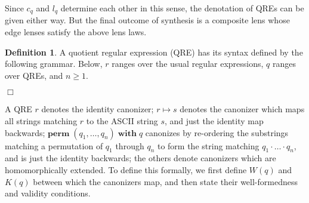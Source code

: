 \documentclass[a4paper,11pt] {article}
\theoremstyle{definition}
\newtheorem{definition}[theorem]{Definition}
\newcommand{\lcanonize}[1]{\textit{$#1$.canonize}}
\newcommand{\lchoose}[1]{\textit{$#1$.choose}}
\newcommand{\perm}{ \textbf{perm}\; }
\newcommand{\with}{ \;\textbf{with}\; }
\begin{document}
Since $c_q$ and $l_q$ determine each other in this sense, the denotation of
QREs can be given either way. But the final outcome of synthesis is a
composite lens whose edge lenses satisfy the above lens laws.

\begin{comment}
The equivalence relation can be given by a canonizer $c_q$ consisting of two functions
\begin{itemize}
\item $\lcanonize{c}: W(q) \to K(q)$ and
\item $\lchoose{c}: K(q) \to W(q)$
\end{itemize}
such that for every $s \in K(q)$,
\begin{align*}
  \lcanonize{c} \; (\lchoose{c} \; s) = s
\end{align*}
\end{comment}

\begin{definition}
A quotient regular expression (QRE) has its syntax defined by
the following grammar. Below, $r$ ranges over the usual regular expressions,
$q$ ranges over QREs, and $n \geq 1$.
\begin{center}
\ottgrammartabular{\ottr\ottinterrule}
\end{center}

\begin{center}
\ottgrammartabular{\ottq\ottinterrule}
\end{center}
\begin{flushright} $\Box$ \end{flushright}
\end{definition}


A QRE $r$ denotes the identity canonizer; $r \mapsto s$ denotes the
canonizer which maps all strings matching $r$ to the ASCII string $s$,
and just the identity map backwards; $\perm(q_1, \ldots, q_n) \with q$
canonizes by re-ordering the substrings matching a permutation of
$q_1$ through $q_n$ to form the string matching
$q_1 \cdot \ldots \cdot q_n$, and is just the identity backwards;
the others denote canonizers which are homomorphically extended.
To define this formally, we first define $W(q)$ and $K(q)$ between
which the canonizers map, and then state their well-formedness and
validity conditions. 
\end{document}
